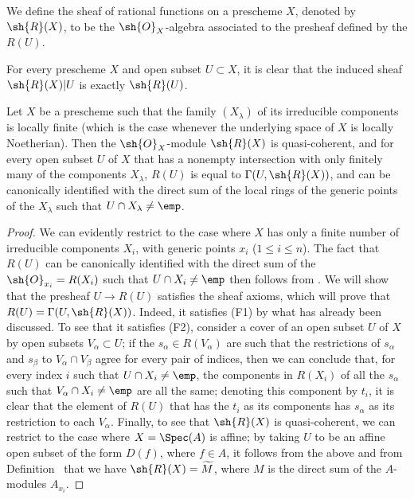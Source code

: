 \begin{definition}[7.3.2]
\label{I.7.3.2}
We
define the sheaf of rational functions on a prescheme $X$, denoted by $\sh{R}(X)$, to be the $\sh{O}_X$-algebra associated to the presheaf defined by the $R(U)$.
\end{definition}

For every prescheme $X$ and open subset $U\subset X$, it is clear that the induced sheaf $\sh{R}(X)|U$ is exactly $\sh{R}(U)$.

\begin{proposition}[7.3.3]
\label{I.7.3.3}
Let $X$ be a prescheme such that the family $(X_\lambda)$ of its irreducible components is locally finite (which is the case whenever the underlying space of $X$ is locally Noetherian).
Then the $\sh{O}_X$-module $\sh{R}(X)$ is quasi-coherent, and for every open subset $U$ of $X$ that has a nonempty intersection with only finitely many of the components $X_\lambda$, $R(U)$ is equal to $\Gamma(U,\sh{R}(X))$, and can be canonically identified with the direct sum of the local rings of the generic points of the $X_\lambda$ such that $U\cap X_\lambda\neq\emp$.
\end{proposition}

\begin{proof}
We can evidently restrict to the case where $X$ has only a finite number of irreducible components $X_i$, with generic points $x_i$ ($1\leq i\leq n$).
The fact that $R(U)$ can be canonically identified with the direct sum of the $\sh{O}_{x_i}=R(X_i)$ such that $U\cap X_i\neq\emp$ then follows from .
We will show that the presheaf $U\to R(U)$ satisfies the sheaf axioms, which will prove that $R(U)=\Gamma(U,\sh{R}(X))$.
Indeed, it satisfies (F1) by what has already been discussed.
To see that it satisfies (F2), consider a cover of an open subset $U$ of $X$ by open subsets $V_\alpha\subset U$; if the $s_\alpha\in R(V_\alpha)$ are such that the restrictions of $s_\alpha$ and $s_\beta$ to $V_\alpha\cap V_\beta$ agree for every pair of indices, then we can conclude that, for every index $i$ such that $U\cap X_i\neq\emp$, the components in $R(X_i)$ of all the $s_\alpha$ such that $V_\alpha\cap X_i\neq\emp$ are all the same; denoting this component by $t_i$, it is clear that the element of $R(U)$ that has the $t_i$ as its components has $s_\alpha$ as its restriction to each $V_\alpha$.
Finally, to see that $\sh{R}(X)$ is quasi-coherent, we can restrict to the case where $X=\Spec(A)$ is affine; by taking $U$ to be an affine open subset of the form $D(f)$, where $f\in A$, it follows from the above and from Definition~ that we have $\sh{R}(X)=\widetilde{M}$, where $M$ is the direct sum of the $A$-modules $A_{x_i}$.
\end{proof}

